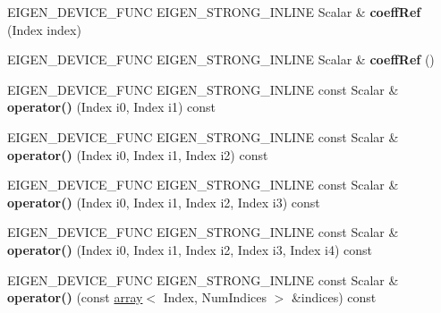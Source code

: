 \begin{DoxyCompactItemize}
\item 
\mbox{\label{class_eigen_1_1_tensor_fixed_size_a025b2fc02f00f9b3a100e85eddc59ca9}} 
E\+I\+G\+E\+N\+\_\+\+D\+E\+V\+I\+C\+E\+\_\+\+F\+U\+NC E\+I\+G\+E\+N\+\_\+\+S\+T\+R\+O\+N\+G\+\_\+\+I\+N\+L\+I\+NE Scalar \& {\bfseries coeff\+Ref} (Index index)
\item 
\mbox{\label{class_eigen_1_1_tensor_fixed_size_a137e21057f64825af9e238b73899a744}} 
E\+I\+G\+E\+N\+\_\+\+D\+E\+V\+I\+C\+E\+\_\+\+F\+U\+NC E\+I\+G\+E\+N\+\_\+\+S\+T\+R\+O\+N\+G\+\_\+\+I\+N\+L\+I\+NE Scalar \& {\bfseries coeff\+Ref} ()
\item 
\mbox{\label{class_eigen_1_1_tensor_fixed_size_a5a4aa31a297d2a37985c920b482e65d2}} 
E\+I\+G\+E\+N\+\_\+\+D\+E\+V\+I\+C\+E\+\_\+\+F\+U\+NC E\+I\+G\+E\+N\+\_\+\+S\+T\+R\+O\+N\+G\+\_\+\+I\+N\+L\+I\+NE const Scalar \& {\bfseries operator()} (Index i0, Index i1) const
\item 
\mbox{\label{class_eigen_1_1_tensor_fixed_size_a3984ef01d56ed7b592a41a7fa1d189c7}} 
E\+I\+G\+E\+N\+\_\+\+D\+E\+V\+I\+C\+E\+\_\+\+F\+U\+NC E\+I\+G\+E\+N\+\_\+\+S\+T\+R\+O\+N\+G\+\_\+\+I\+N\+L\+I\+NE const Scalar \& {\bfseries operator()} (Index i0, Index i1, Index i2) const
\item 
\mbox{\label{class_eigen_1_1_tensor_fixed_size_ac466617802d0eff23691fdbfca00b8d9}} 
E\+I\+G\+E\+N\+\_\+\+D\+E\+V\+I\+C\+E\+\_\+\+F\+U\+NC E\+I\+G\+E\+N\+\_\+\+S\+T\+R\+O\+N\+G\+\_\+\+I\+N\+L\+I\+NE const Scalar \& {\bfseries operator()} (Index i0, Index i1, Index i2, Index i3) const
\item 
\mbox{\label{class_eigen_1_1_tensor_fixed_size_a2b5d80e6ff88759a7ac62a5ea107ad2a}} 
E\+I\+G\+E\+N\+\_\+\+D\+E\+V\+I\+C\+E\+\_\+\+F\+U\+NC E\+I\+G\+E\+N\+\_\+\+S\+T\+R\+O\+N\+G\+\_\+\+I\+N\+L\+I\+NE const Scalar \& {\bfseries operator()} (Index i0, Index i1, Index i2, Index i3, Index i4) const
\item 
\mbox{\label{class_eigen_1_1_tensor_fixed_size_a21f7b374704b4825632d6525930f269d}} 
E\+I\+G\+E\+N\+\_\+\+D\+E\+V\+I\+C\+E\+\_\+\+F\+U\+NC E\+I\+G\+E\+N\+\_\+\+S\+T\+R\+O\+N\+G\+\_\+\+I\+N\+L\+I\+NE const Scalar \& {\bfseries operator()} (const \hyperlink{class_eigen_1_1array}{array}$<$ Index, Num\+Indices $>$ \&indices) const

\end{DoxyCompactItemize}
